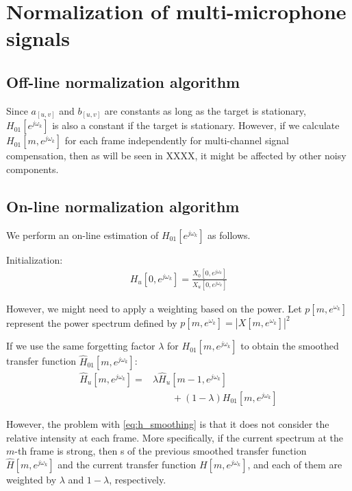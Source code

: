 \documentclass[journal]{IEEEtran}
\begin{document}
\section{Normalization of multi-microphone signals}

\subsection{Off-line normalization algorithm}


Since $a_{[u, v]}$ and $b_{[u, v]}$ are constants
as long as the target is stationary,  $H_{01}[e^{j\omega_k}]$
is also a constant if the target is stationary. However,
if we calculate $H_{01}[m, e^{j\omega_k}]$ for each frame 
independently for multi-channel signal compensation, 
then as will be seen in XXXX, it might be affected by other noisy components.


\subsection{On-line normalization algorithm}

We perform an on-line estimation of $H_{01}[e^{j\omega_k}]$ as follows.

Initialization: \\
\begin{align}
  H_u[0, e^{j\omega_k}] = \frac{X_0[0, e^{j\omega_k}]} 
        {X_u[0, e^{j\omega_k}]}  
\end{align}

However, we might need to apply a weighting based on the power.
Let $p[m, e^{\omega_k}]$ represent the power spectrum defined by
$p[m, e^{\omega_k}] = |X[m, e^{\omega_k}]|^2$


If we use the same forgetting factor $\lambda$ for 
$H_{01}[m, e^{j \omega_k}]$ to obtain the smoothed transfer function
$\hat{H}_{01}[m, e^{j \omega_k}]$:
\begin{align}
            \label{eq:h_smoothing}
  \hat{H}_u[m, e^{j\omega_k}] 
      = &  \lambda \hat{H}_u[m - 1, e^{j \omega_k}]  \\ \nonumber 
        &  \qquad + (1 - \lambda) H_{01}[m, e^{j \omega_k}] 
\end{align}

However, the problem with \eqref{eq:h_smoothing} is that
it does not consider the relative intensity at each frame.
More specifically, if the current spectrum at the $m$-th frame is
strong, then s 
of the previous smoothed transfer function $\hat{H}[m, e^{j \omega_k}]$ 
and the current transfer function $H[m, e^{j \omega_k}]$, and 
each of them are weighted by $\lambda$ and $1 - \lambda$, respectively.
\end{document}
